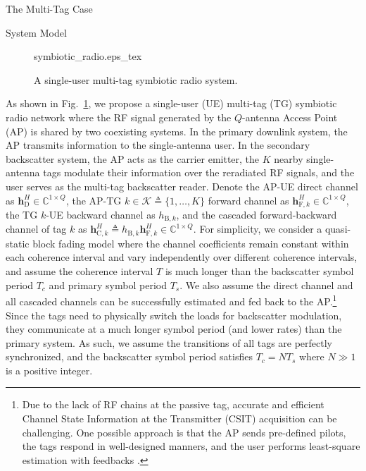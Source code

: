 \documentclass[journal]{IEEEtran}
\begin{document}
	\begin{section}{The Multi-Tag Case}
		\begin{subsection}{System Model}
			\begin{figure}[!t]
				\centering
				\def\svgwidth{0.9\columnwidth}
				{symbiotic_radio.eps_tex}
				\caption{A single-user multi-tag symbiotic radio system.}
				\label{fi:symbiotic_radio}
			\end{figure}
			As shown in Fig.~\ref{fi:symbiotic_radio}, we propose a single-user (UE) multi-tag (TG) symbiotic radio network where the RF signal generated by the $Q$-antenna Access Point (AP) is shared by two coexisting systems. In the primary downlink system, the AP transmits information to the single-antenna user. In the secondary backscatter system, the AP acts as the carrier emitter, the $K$ nearby single-antenna tags modulate their information over the reradiated RF signals, and the user serves as the multi-tag backscatter reader. Denote the AP-UE direct channel as $\boldsymbol{h}_{\mathrm{D}}^H \in \mathbb{C}^{1 \times Q}$, the AP-TG $k \in \mathcal{K} \triangleq \{1,\ldots,K\}$ forward channel as $\boldsymbol{h}_{\mathrm{F},k}^H \in \mathbb{C}^{1 \times Q}$, the TG $k$-UE backward channel as $h_{\mathrm{B},k}$, and the cascaded forward-backward channel of tag $k$ as $\boldsymbol{h}_{\mathrm{C},k}^H \triangleq h_{\mathrm{B},k} \boldsymbol{h}_{\mathrm{F},k}^H \in \mathbb{C}^{1 \times Q}$. For simplicity, we consider a quasi-static block fading model where the channel coefficients remain constant within each coherence interval and vary independently over different coherence intervals, and assume the coherence interval $T$ is much longer than the backscatter symbol period $T_c$ and primary symbol period $T_s$. We also assume the direct channel and all cascaded channels can be successfully estimated and fed back to the AP.\footnote{Due to the lack of RF chains at the passive tag, accurate and efficient Channel State Information at the Transmitter (CSIT) acquisition can be challenging. One possible approach is that the AP sends pre-defined pilots, the tags respond in well-designed manners, and the user performs least-square estimation with feedbacks \cite{Bharadia2015,Yang2015b,Guo2019e}.} Since the tags need to physically switch the loads for backscatter modulation, they communicate at a much longer symbol period (and lower rates) than the primary system. As such, we assume the transitions of all tags are perfectly synchronized, and the backscatter symbol period satisfies $T_c = N T_s$ where $N \gg 1$ is a positive integer.


\end{subsection}
\end{section}
\end{document}
